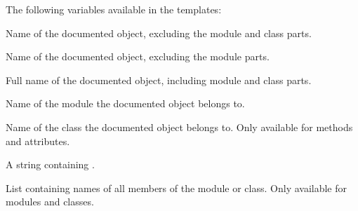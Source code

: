 \documentclass[letterpaper,10pt,english]{sphinxmanual}
\begin{document}
The following variables available in the templates:

\begin{fulllineitems}
\label{ext/autosummary:name}
Name of the documented object, excluding the module and class parts.

\end{fulllineitems}


\begin{fulllineitems}
\label{ext/autosummary:objname}
Name of the documented object, excluding the module parts.

\end{fulllineitems}


\begin{fulllineitems}
\label{ext/autosummary:fullname}
Full name of the documented object, including module and class parts.

\end{fulllineitems}


\begin{fulllineitems}
\label{ext/autosummary:module}
Name of the module the documented object belongs to.

\end{fulllineitems}


\begin{fulllineitems}
\label{ext/autosummary:class}
Name of the class the documented object belongs to.  Only available for
methods and attributes.

\end{fulllineitems}


\begin{fulllineitems}
\label{ext/autosummary:underline}
A string containing .

\end{fulllineitems}


\begin{fulllineitems}
\label{ext/autosummary:members}
List containing names of all members of the module or class.  Only available
for modules and classes.

\end{fulllineitems}
\end{document}

